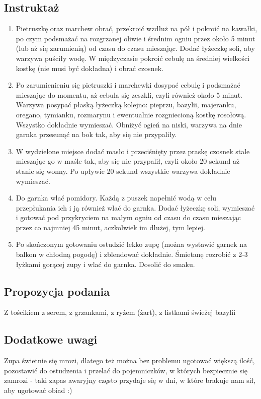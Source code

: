 \documentclass[a4paper,10pt]{book}
\begin{document}
\subsection*{Instruktaż}
\begin{enumerate}
    \item Pietruszkę oraz marchew obrać, przekroić wzdłuż na pół i pokroić na kawałki, po czym podsmażać na rozgrzanej oliwie i średnim ogniu przez około 5 minut (lub aż się zarumienią) od czasu do czasu mieszając. Dodać łyżeczkę soli, aby warzywa puściły wodę. W międzyczasie pokroić cebulę na średniej wielkości kostkę (nie musi być dokładna) i obrać czosnek.
    \item Po zarumienieniu się pietruszki i marchewki dosypać cebulę i podsmażać mieszając do momentu, aż cebula się zeszkli, czyli również około 5 minut. Warzywa posypać płaską łyżeczką kolejno: pieprzu, bazylii, majeranku, oregano, tymianku, rozmarynu i ewentualnie rozgniecioną kostkę rosołową. Wszystko dokładnie wymieszać. Obniżyć ogień na niski, warzywa na dnie garnka przesunąć na bok tak, aby się nie przypaliły.
    \item W wydzielone miejsce dodać masło i przeciśnięty przez praskę czosnek stale mieszając go w maśle tak, aby się nie przypalił, czyli około 20 sekund aż stanie się wonny. Po upływie 20 sekund wszystkie warzywa dokładnie wymieszać.
    \item Do garnka wlać pomidory. Każdą z puszek napełnić wodą w celu przepłukania ich i ją również wlać do garnka. Dodać łyżeczkę soli, wymieszać i gotować pod przykryciem na małym ogniu od czasu do czasu mieszając przez co najmniej 45 minut, aczkolwiek im dłużej, tym lepiej.
    \item Po skończonym gotowaniu ostudzić lekko zupę (można wystawić garnek na balkon w chłodną pogodę) i zblendować dokładnie. Śmietanę rozrobić z 2-3 łyżkami gorącej zupy i wlać do garnka. Dosolić do smaku.
\end{enumerate}

\vspace{0.5cm} 

\small
\subsection*{Propozycja podania}
Z tościkiem z serem, z grzankami, z ryżem (żart), z listkami świeżej bazylii

\vspace{0.3cm}

\subsection*{Dodatkowe uwagi}
Zupa świetnie się mrozi, dlatego też można bez problemu ugotować większą ilość, pozostawić do ostudzenia i przelać do pojemniczków, w których bezpiecznie się zamrozi - taki zapas awaryjny często przydaje się w dni, w które brakuje nam sił, aby ugotować obiad :)
\end{document}
